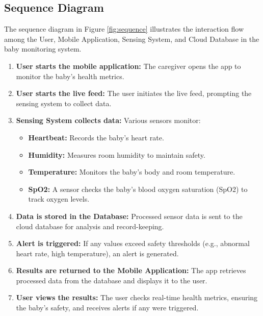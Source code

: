 \documentclass[12pt,a4paper]{report}
\begin{document}
\subsection{Sequence Diagram}
The sequence diagram in Figure \ref{fig:sequence} illustrates the interaction flow among the User, Mobile Application, Sensing System, and Cloud Database in the baby monitoring system.

\begin{enumerate}
  \item \textbf{User starts the mobile application:} The caregiver opens the app to monitor the baby’s health metrics.
  \item \textbf{User starts the live feed:} The user initiates the live feed, prompting the sensing system to collect data.
  \item \textbf{Sensing System collects data:} Various sensors monitor:
        \begin{itemize}
          \item \textbf{Heartbeat:} Records the baby’s heart rate.
          \item \textbf{Humidity:} Measures room humidity to maintain safety.
          \item \textbf{Temperature:} Monitors the baby's body and room temperature.
          \item \textbf{SpO2:} A sensor checks the baby’s blood oxygen saturation (SpO2) to track oxygen levels.
        \end{itemize}
  \item \textbf{Data is stored in the Database:} Processed sensor data is sent to the cloud database for analysis and record-keeping.
  \item \textbf{Alert is triggered:} If any values exceed safety thresholds (e.g., abnormal heart rate, high temperature), an alert is generated.
  \item \textbf{Results are returned to the Mobile Application:} The app retrieves processed data from the database and displays it to the user.
  \item \textbf{User views the results:} The user checks real-time health metrics, ensuring the baby's safety, and receives alerts if any were triggered.
\end{enumerate}
\end{document}
